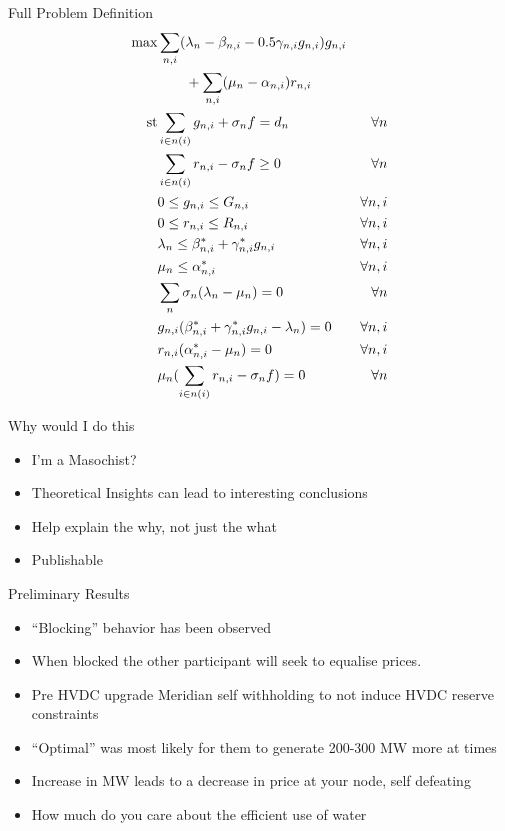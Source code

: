 \documentclass[xcolor=x11names,compress]{beamer}
\renewcommand{\(}{\begin{columns}}
\renewcommand{\)}{\end{columns}}
\newcommand{\<}[1]{\begin{column}{#1}}
\renewcommand{\>}{\end{column}}
\begin{document}
\begin{frame}{Full Problem Definition}
\begin{eqnarray*}
\max & \sum_{n,i} (\lambda_{n} - \beta_{n,i} - 0.5\gamma_{n,i}g_{n,i})g_{n,i}  & \\
& \qquad + \sum_{n,i} (\mu_{n} - \alpha_{n,i})r_{n,i} & \\
\mathrm{st} &\sum_{i \in n(i)} g_{n,i} + \sigma_{n}f = d_{n} \hspace{0.2cm} & \forall n \\
&\sum_{i \in n(i)} r_{n,i} -\sigma_{n}f \ge 0 \hspace{0.2cm} & \forall n \\
& 0 \le g_{n,i} \le G_{n,i} & \forall n, i \\
& 0 \le r_{n,i} \le R_{n,i} & \forall n, i \\
& \lambda_{n} \le \beta^{*}_{n,i} + \gamma^{*}_{n,i}g_{n,i} & \forall n, i \\
& \mu_{n} \le \alpha^{*}_{n,i} & \forall n, i \\
& \sum_{n} \sigma_{n}(\lambda_{n} - \mu_{n}) = 0 & \forall n \\
& g_{n,i}(\beta^{*}_{n,i} + \gamma^{*}_{n,i}g_{n,i} - \lambda_{n}) = 0 & \forall n,i \\
& r_{n,i}(\alpha^{*}_{n,i} - \mu_{n}) = 0 & \forall n, i \\
& \mu_{n}(\sum_{i \in n(i)} r_{n,i} - \sigma_{n}f) = 0 & \forall n
\end{eqnarray*}
\end{frame}

\begin{frame}{Why would I do this}
\begin{itemize}
\item I'm a Masochist?
\item Theoretical Insights can lead to interesting conclusions
\item Help explain the why, not just the what
\item Publishable
\end{itemize}
\end{frame}

\begin{frame}{Preliminary Results}
\begin{itemize}
\item ``Blocking'' behavior has been observed
\item When blocked the other participant will seek to equalise prices.
\item Pre HVDC upgrade Meridian self withholding to not induce HVDC reserve constraints
\item ``Optimal'' was most likely for them to generate 200-300 MW more at times
\item Increase in MW leads to a decrease in price at your node, self defeating
\item How much do you care about the efficient use of water
\end{itemize}
\end{frame}
\end{document}
